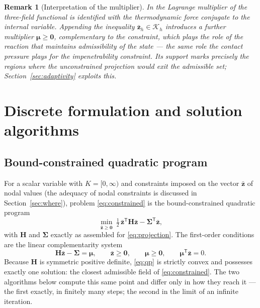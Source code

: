 \documentclass[11pt]{article}
\newcommand{\bs}[1]{\boldsymbol{#1}}
\newtheorem{remark}{Remark}
\begin{document}
\begin{remark}[Interpretation of the multiplier]
\label{rem:multiplier}
In \cite{mota2013} the Lagrange multiplier of the three-field functional
is identified with the thermodynamic force conjugate to the internal
variable. Appending the inequality $\bar{\bs{z}}_h \in \mathcal{K}_h$
introduces a further multiplier $\bs{\mu} \geq \bs{0}$, complementary to
the constraint, which plays the role of the reaction that maintains
admissibility of the state --- the same role the contact pressure plays
for the impenetrability constraint. Its support marks precisely the
regions where the unconstrained projection would exit the admissible set;
Section~\ref{sec:adaptivity} exploits this.
\end{remark}

\section{Discrete formulation and solution algorithms}
\label{sec:discrete}

\subsection{Bound-constrained quadratic program}

For a scalar variable with $K = [0,\infty)$ and constraints imposed on
the vector $\bar{\bs{z}}$ of nodal values (the adequacy of nodal
constraints is discussed in Section~\ref{sec:where}), problem
\eqref{eq:constrained} is the bound-constrained quadratic program
\begin{equation}
\min_{\bar{\bs{z}} \geq \bs{0}} \
\tfrac12\, \bar{\bs{z}}^{\mathsf{T}} \bs{H} \bar{\bs{z}}
- \bs{\Sigma}^{\mathsf{T}} \bar{\bs{z}},
\label{eq:qp}
\end{equation}
with $\bs{H}$ and $\bs{\Sigma}$ exactly as assembled for
\eqref{eq:projection}. The first-order conditions are the linear
complementarity system
\begin{equation}
\bs{H} \bar{\bs{z}} - \bs{\Sigma} = \bs{\mu}, \qquad
\bar{\bs{z}} \geq \bs{0}, \qquad \bs{\mu} \geq \bs{0}, \qquad
\bs{\mu}^{\mathsf{T}} \bar{\bs{z}} = 0 .
\label{eq:kkt}
\end{equation}
Because $\bs{H}$ is symmetric positive definite, \eqref{eq:qp} is
strictly convex and possesses exactly one solution: the closest
admissible field of \eqref{eq:constrained}. The two algorithms below
compute this same point and differ only in how they reach it --- the
first exactly, in finitely many steps; the second in the limit of an
infinite iteration.
\end{document}
